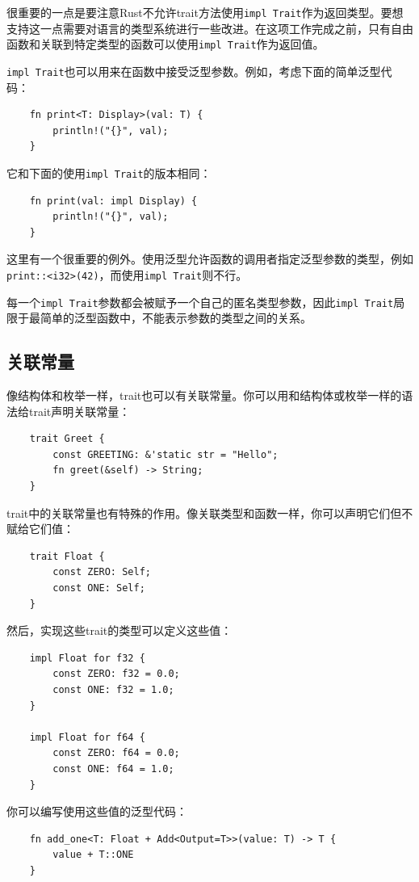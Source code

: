 很重要的一点是要注意Rust不允许trait方法使用\texttt{impl Trait}作为返回类型。要想支持这一点需要对语言的类型系统进行一些改进。在这项工作完成之前，只有自由函数和关联到特定类型的函数可以使用\texttt{impl Trait}作为返回值。

\texttt{impl Trait}也可以用来在函数中接受泛型参数。例如，考虑下面的简单泛型代码：
\begin{verbatim}
    fn print<T: Display>(val: T) {
        println!("{}", val);
    }
\end{verbatim}

它和下面的使用\texttt{impl Trait}的版本相同：
\begin{verbatim}
    fn print(val: impl Display) {
        println!("{}", val);
    }
\end{verbatim}

这里有一个很重要的例外。使用泛型允许函数的调用者指定泛型参数的类型，例如\texttt{print::<i32>(42)}，而使用\texttt{impl Trait}则不行。

每一个\texttt{impl Trait}参数都会被赋予一个自己的匿名类型参数，因此\texttt{impl Trait}局限于最简单的泛型函数中，不能表示参数的类型之间的关系。

\subsection{关联常量}
像结构体和枚举一样，trait也可以有关联常量。你可以用和结构体或枚举一样的语法给trait声明关联常量：
\begin{verbatim}
    trait Greet {
        const GREETING: &'static str = "Hello";
        fn greet(&self) -> String;
    }
\end{verbatim}

trait中的关联常量也有特殊的作用。像关联类型和函数一样，你可以声明它们但不赋给它们值：
\begin{verbatim}
    trait Float {
        const ZERO: Self;
        const ONE: Self;
    }
\end{verbatim}

然后，实现这些trait的类型可以定义这些值：
\begin{verbatim}
    impl Float for f32 {
        const ZERO: f32 = 0.0;
        const ONE: f32 = 1.0;
    }

    impl Float for f64 {
        const ZERO: f64 = 0.0;
        const ONE: f64 = 1.0;
    }
\end{verbatim}

你可以编写使用这些值的泛型代码：
\begin{verbatim}
    fn add_one<T: Float + Add<Output=T>>(value: T) -> T {
        value + T::ONE
    }
\end{verbatim}

